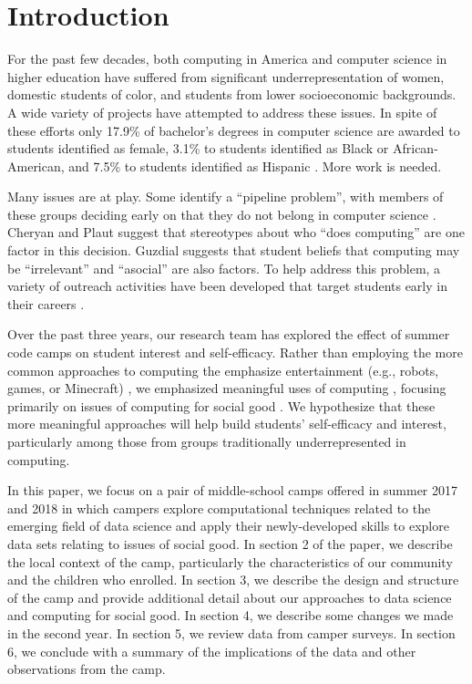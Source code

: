\section{Introduction}

For the past few decades, both computing in America and
computer science in higher education have suffered from significant
underrepresentation of women, domestic students of color, and
students from lower socioeconomic backgrounds.  A wide variety of
projects have attempted to address these issues.  In spite of these
efforts only 17.9\% of bachelor's degrees in computer science are
awarded to students identified as female, 3.1\% to students identified
as Black or African-American, and 7.5\% to students identified as
Hispanic \cite{Taulbee2016}.  More work is needed.

Many issues are at play.  Some identify
a ``pipeline problem'', with members of these groups deciding
early on that they do not belong in computer science \cite{Gurer2002}.
Cheryan and Plaut \cite{Cheryan2010} suggest that stereotypes about
who ``does computing'' are one factor in this decision.  Guzdial
\cite{Guzdial2009} suggests that student beliefs that computing may
be ``irrelevant'' and ``asocial'' are also factors.  To help address
this problem, a variety of outreach activities have been developed
that target students early in their careers \cite{McGill2015,Decker2016}.

Over the past three years, our research team has explored the effect
of summer code camps on student interest and self-efficacy.  Rather
than employing the more common approaches to computing the emphasize
entertainment (e.g., robots, games, or Minecraft) \cite{DeWitt2017},
we emphasized meaningful uses of computing
\cite{arts-coding,dssg-sigcse-2018}, focusing primarily on issues
of computing for social good \cite{Goldweber2013}.  We hypothesize
that these more meaningful approaches will help build students'
self-efficacy and interest, particularly among those from groups
traditionally underrepresented in computing.

In this paper, we focus on a pair of middle-school camps offered in summer 2017
and 2018 in which campers explore computational
techniques related to the emerging field of data science and apply
their newly-developed skills to explore data sets relating to issues
of social good.
In section 2 of the paper, we describe the local context of the
camp, particularly the characteristics of our community and the
children who enrolled.  In section 3, we describe the design and
structure of the camp and provide additional detail about our
approaches to data science and computing for social good.  In section
4, we describe some changes we made  in the second year.  In section
5, we review data from camper surveys.  In section 6, we
conclude with a summary of the implications of the data and other
observations from the camp.

